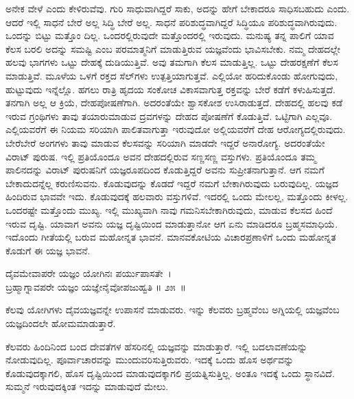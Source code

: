 ಅನೇಕ ವೇಳೆ  ಎಂದು ಕೇಳಿರುವೆವು. ಗುರಿ ಸಾಧುವಾಗಿದ್ದರೆ ಸಾಕು, ಅದನ್ನು ಹೇಗೆ ಬೇಕಾದರೂ ಸಾಧಿಸಬಹುದು ಎಂದು. ಆದರೆ ಇಲ್ಲಿ ಸಾಧನೆ ಬೇರೆ ಅಲ್ಲ ಸಿದ್ಧಿ ಬೇರೆ ಅಲ್ಲ. ಸಾಧನೆ ಪರಿಶುದ್ಧವಾಗಿದ್ದರೆ ಸಿದ್ಧಿಯೂ ಪರಿಶುದ್ಧವಾಗಿರುವುದು. ಒಂದನ್ನು ಬಿಟ್ಟು ಮತ್ತೊಂ ದಿಲ್ಲ. ಒಂದರಲ್ಲಿರುವುದೇ ಮತ್ತೊಂದರಲ್ಲಿ ಇರುವುದು. ಮನುಷ್ಯ ತನ್ನ ಪಾಲಿಗೆ ಯಾವ ಕೆಲಸ ಬರಲಿ ಅದನ್ನು ಸಮಷ್ಟಿ ಎಂಬ ಪರಮಾತ್ಮನಿಗೆ ಮಾಡುತ್ತಿರುವ ಯಜ್ಞವೆಂದು ಭಾವಿಸಬೇಕು. ನಮ್ಮ ದೇಹದಲ್ಲೇ ಹಲವು ಭಾಗಗಳು ಒಟ್ಟು ದೇಹಕ್ಕೆ ದುಡಿಯುತ್ತಿವೆ. ಅವು ತಮಗಾಗಿ ಕೆಲಸ ಮಾಡುತ್ತಿಲ್ಲ. ಒಟ್ಟು ದೇಹರಕ್ಷಣೆಗೆ ಕೆಲಸ ಮಾಡುತ್ತಿವೆ. ಮೂಳೆಯ ಒಳಗೆ ರಕ್ತದ ಸೆಲ್​ಗಳು ಉತ್ಪತ್ತಿಯಾಗುತ್ತವೆ. ಎಲ್ಲಿಯೋ ಹರಿದುಕೊಂಡು ಹೋಗುವುದು, ಹುಟ್ಟುವುದು ಇನ್ನೆಲ್ಲೊ. ಹಗಲು ರಾತ್ರಿ ಹೃದಯ ಸಂಕೋಚ ವಿಕಾಸವಾಗುತ್ತ ರಕ್ತವನ್ನು ಬೇರೆ ಕಡೆಗೆ ಕಳುಹಿಸುತ್ತದೆ. ತನಗಾಗಿ ಅಲ್ಲ ಆ ಕ್ರಿಯೆ, ದೇಹಪೋಷಣೆಗಾಗಿ. ಅದರಂತೆಯೇ ಶ್ವಾಸಕೋಶ ಉಸಿರಾಡುತ್ತದೆ. ದೇಹದಲ್ಲಿ ಹಲವು ಕಡೆ ಇರುವ ಗ್ರಂಥಿಗಳು  ತಾವು ತಯಾರುಮಾಡುವ ದ್ರವಗಳನ್ನು ದೇಹದ ಪೋಷಣೆಗೆ ಕೊಡುತ್ತಿವೆ. ಒಟ್ಟಿಗಾಗಿ ಎಲ್ಲವೂ. ಎಲ್ಲಿಯವರೆಗೆ ಈ ನಿಯಮ ಸರಿಯಾಗಿ ಪಾಲಿತವಾಗುತ್ತಾ ಇರುವುದೋ ಅಲ್ಲಿಯವರೆಗೆ ದೇಹ ಆರೋಗ್ಯದಲ್ಲಿರುವುದು. ಬೇರೆಬೇರೆ ಅಂಗಗಳು ತಾವು ಮಾಡುವ ಕೆಲಸವನ್ನು ಸರಿಯಾಗಿ ಮಾಡದೇ ಇದ್ದರೆ ಅನಾರೋಗ್ಯ. ಅದರಂತೆಯೇ ವಿರಾಟ್ ಪುರುಷ. ಇಲ್ಲಿ ಪ್ರತಿಯೊಂದೂ ಅವನ ದೇಹದಲ್ಲಿರುವ ಸಣ್ಣಸಣ್ಣ ವಸ್ತುಗಳು. ಪ್ರತಿಯೊಂದೂ ತಮ್ಮ ಪಾಲಿನದನ್ನು ವಿರಾಟ್ ಪುರುಷನಿಗೆ ಯಜ್ಞರೂಪದಿಂದ ಕೊಡುತ್ತಿದ್ದರೆ ಅವನು ಸುಪ್ರೀತನಾಗುತ್ತಾನೆ. ಆಗ ನಮಗೆ ಬೇಕಾದುದನ್ನೆಲ್ಲ ಕರುಣಿಸುವನು. ಕೊಡುವುದನ್ನು ಕೊಡದೆ ಇದ್ದರೆ ನಮಗೆ ಬೇಕಾಗಿರುವುದು ಬರುವುದಿಲ್ಲ. ಯಜ್ಞದ ಹಿಂದಿರುವ ಭಾವವೇ ಇದು. ಕೊಡುವುದಕ್ಕೆ ಹಲವಾರು ವಸ್ತುಗಳಿವೆ. ಇದರಲ್ಲಿ ಒಂದು ಮೇಲಲ್ಲ, ಮತ್ತೊಂದು ಕೀಳಲ್ಲ. ಒಂದರಷ್ಟೇ ಮತ್ತೊಂದು ಮುಖ್ಯ. ಇಲ್ಲಿ ಮುಖ್ಯವಾಗಿ ನಾವು ಗಮನಿಸಬೇಕಾಗಿರುವುದು, ಮಾಡುವ ಕೆಲಸದ ಹಿಂದೆ ಇರುವ ದೃಷ್ಟಿ. ಯಾವಾಗ ಅವನು ಯಜ್ಞ ದೃಷ್ಟಿಯಿಂದ ಮಾಡುತ್ತಾನೋ ಆಗ ಏನು ಮಾಡಿದರೂ ಬ್ರಹ್ಮಸಮಾಧಿಯೆ. ಇದೊಂದು ಗೀತೆಯಲ್ಲಿ ಬರುವ ಮಹೋನ್ನತ ಭಾವನೆ. ಮಾನವಕೋಟಿಯ ವಿಚಾರಪ್ರಣಾಳಿಗೆ ಒಂದು ಮಹೋನ್ನತ ಕೊಡುಗೆ ಈ ಯಜ್ಞ ಭಾವನೆ.

\begin{shloka}
ದೈವಮೇವಾಪರೇ ಯಜ್ಞಂ ಯೋಗಿನಃ ಪರ್ಯುಪಾಸತೇ~।\\ಬ್ರಹ್ಮಾಗ್ನಾವಪರೇ ಯಜ್ಞಂ ಯಜ್ಞೇನೈವೋಪಜುಹ್ವತಿ \hfill॥ ೨೫~॥
\end{shloka}

\begin{artha}
ಕೆಲವು ಯೋಗಿಗಳು ದೈವಯಜ್ಞವನ್ನೇ ಉಪಾಸನೆ ಮಾಡುವರು. ಇನ್ನು ಕೆಲವರು ಬ್ರಹ್ಮವೆಂಬ ಅಗ್ನಿಯಲ್ಲಿ ಯಜ್ಞವೆಂಬ ಯಜ್ಞದಿಂದಲೇ ಹೋಮಮಾಡುತ್ತಾರೆ.
\end{artha}

ಕೆಲವರು ಹಿಂದಿನಿಂದ ಬಂದ ದೇವತೆಗಳ ಹೆಸರಿನಲ್ಲಿ ಯಜ್ಞವನ್ನು ಮಾಡುತ್ತಾರೆ. ಇಲ್ಲಿ ಬದಲಾವಣೆಯನ್ನು ನೋಡುವುದಿಲ್ಲ. ಪೂರ್ವಾಚಾರವನ್ನು ಮುಂದುವರಿಸುತ್ತಿರುವರು. ಇದಕ್ಕೆ ಒಂದು ಹೊಸ ಅರ್ಥವನ್ನು ಕೊಡುವುದಕ್ಕಾಗಲಿ, ಹೊಸ ದೃಷ್ಟಿಯಿಂದ ಮಾಡುವುದಕ್ಕಾಗಲಿ ಪ್ರಯತ್ನಿಸುತ್ತಿಲ್ಲ. ಅಂತೂ ಇದಕ್ಕೆ ಒಂದು ಸ್ಥಾನವಿದೆ. ಸುಮ್ಮನೆ ಇರುವುದಕ್ಕಿಂತ ಇದನ್ನು ಮಾಡುವುದೆ ಮೇಲು.

